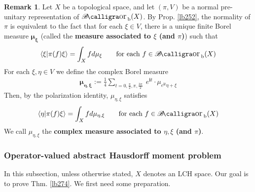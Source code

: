 \documentclass[12pt,b5paper,notitlepage]{article}
\theoremstyle{definition}
\newtheorem{rem}[df]{Remark}
\theoremstyle{plain}
\DeclareMathOperator{\Borb}{{\mathscr{B}\text{\kern -2pt {\calligra\large or}}\,}_{\mathrm b}}
\newcommand{\bk}[1]{\langle {#1}\rangle}
\newcommand{\im}{\mathbf{i}}
\numberwithin{equation}{section}
\begin{document}
\begin{rem}\label{lb297}
Let $X$ be a topological space, and let $(\pi,V)$ be a normal pre-unitary representation of $\Borb(X)$. By Prop. \ref{lb252}, the normality of $\pi$ is equivalent to the fact that for each $\xi\in V$, there is a unique finite Borel measure $\pmb{\mu_\xi}$  (called the \textbf{measure associated to $\xi$ (and $\pi$)})  such that
\begin{align*}
\bk{\xi|\pi(f)\xi}=\int_X fd\mu_\xi\qquad\text{for each }f\in\Borb(X)
\end{align*}
For each $\xi,\eta\in V$ we define the complex Borel measure
\begin{align*}
\pmb{\mu_{\eta,\xi}}:=\frac 14\sum_{t=0,\frac \pi 2,\pi,\frac{3\pi}2}~ e^{\im t}\cdot \mu_{e^{\im t}\eta+\xi}
\end{align*}
Then, by the polarization identity, $\mu_{\eta,\xi}$ satisfies
\begin{align*}
\bk{\eta|\pi(f)\xi}=\int_X fd\mu_{\eta,\xi}\qquad\text{for each }f\in\Borb(X)
\end{align*}
We call $\mu_{\eta,\xi}$ the \textbf{complex measure associated to $\eta,\xi$ (and $\pi$)}. 
\end{rem}



\subsubsection{Operator-valued abstract Hausdorff moment problem}

In this subsection, unless otherwise stated, $X$ denotes an LCH space. Our goal is to prove Thm. \ref{lb274}. We first need some preparation.
\end{document}
